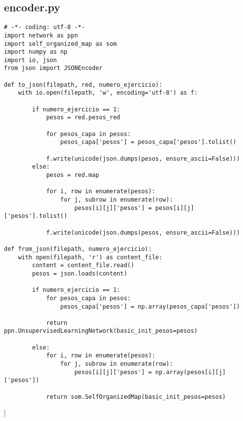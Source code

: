 \newpage
\subsection{encoder.py}

\begin{changemargin}{-2.0cm}{-1.5cm} 
\begin{verbatim}
# -*- coding: utf-8 -*-
import network as ppn
import self_organized_map as som
import numpy as np
import io, json
from json import JSONEncoder

def to_json(filepath, red, numero_ejercicio):
    with io.open(filepath, 'w', encoding='utf-8') as f:

        if numero_ejercicio == 1:
            pesos = red.pesos_red

            for pesos_capa in pesos:
                pesos_capa['pesos'] = pesos_capa['pesos'].tolist()

            f.write(unicode(json.dumps(pesos, ensure_ascii=False)))
        else:
            pesos = red.map

            for i, row in enumerate(pesos):
                for j, subrow in enumerate(row):
                    pesos[i][j]['pesos'] = pesos[i][j]['pesos'].tolist()

            f.write(unicode(json.dumps(pesos, ensure_ascii=False)))

def from_json(filepath, numero_ejercicio):
    with open(filepath, 'r') as content_file:
        content = content_file.read()
        pesos = json.loads(content)

        if numero_ejercicio == 1:
            for pesos_capa in pesos:
                pesos_capa['pesos'] = np.array(pesos_capa['pesos'])

            return ppn.UnsupervisedLearningNetwork(basic_init_pesos=pesos)

        else:
            for i, row in enumerate(pesos):
                for j, subrow in enumerate(row):
                    pesos[i][j]['pesos'] = np.array(pesos[i][j]['pesos'])

            return som.SelfOrganizedMap(basic_init_pesos=pesos)

\end{verbatim}
\end{changemargin}|